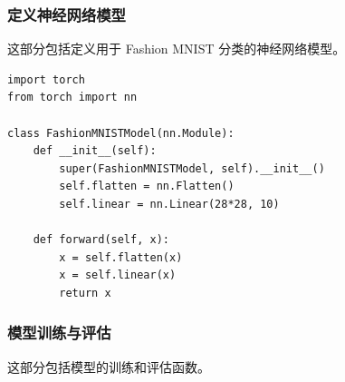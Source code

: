 \documentclass[a4paper,12pt]{article}
\begin{document}
\subsubsection{定义神经网络模型}
这部分包括定义用于 Fashion MNIST 分类的神经网络模型。
\begin{lstlisting}
import torch
from torch import nn

class FashionMNISTModel(nn.Module):
    def __init__(self):
        super(FashionMNISTModel, self).__init__()
        self.flatten = nn.Flatten()
        self.linear = nn.Linear(28*28, 10)

    def forward(self, x):
        x = self.flatten(x)
        x = self.linear(x)
        return x

\end{lstlisting}

\subsubsection{模型训练与评估}
这部分包括模型的训练和评估函数。
\end{document}
